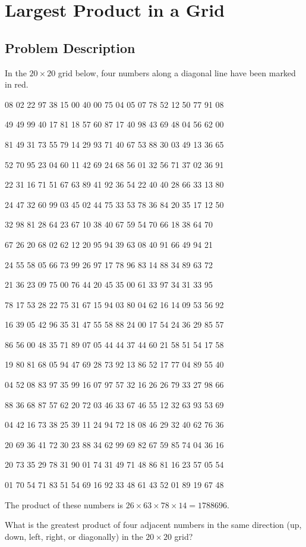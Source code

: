 \section{Largest Product in a Grid}
\subsection{Problem Description}
In the $20 \times 20$
 grid below, four numbers along a diagonal line have been marked in red.

 \begin{center}
08 02 22 97 38 15 00 40 00 75 04 05 07 78 52 12 50 77 91 08

49 49 99 40 17 81 18 57 60 87 17 40 98 43 69 48 04 56 62 00

81 49 31 73 55 79 14 29 93 71 40 67 53 88 30 03 49 13 36 65

52 70 95 23 04 60 11 42 69 24 68 56 01 32 56 71 37 02 36 91

22 31 16 71 51 67 63 89 41 92 36 54 22 40 40 28 66 33 13 80

24 47 32 60 99 03 45 02 44 75 33 53 78 36 84 20 35 17 12 50

32 98 81 28 64 23 67 10 {\color{red!80!black}{26}} 38 40 67 59 54 70 66 18 38 64 70

67 26 20 68 02 62 12 20 95 {\color{red!80!black}{63}} 94 39 63 08 40 91 66 49 94 21

24 55 58 05 66 73 99 26 97 17 {\color{red!80!black}{78}} 78 96 83 14 88 34 89 63 72

21 36 23 09 75 00 76 44 20 45 35 {\color{red!80!black}{14}} 00 61 33 97 34 31 33 95

78 17 53 28 22 75 31 67 15 94 03 80 04 62 16 14 09 53 56 92

16 39 05 42 96 35 31 47 55 58 88 24 00 17 54 24 36 29 85 57

86 56 00 48 35 71 89 07 05 44 44 37 44 60 21 58 51 54 17 58

19 80 81 68 05 94 47 69 28 73 92 13 86 52 17 77 04 89 55 40

04 52 08 83 97 35 99 16 07 97 57 32 16 26 26 79 33 27 98 66

88 36 68 87 57 62 20 72 03 46 33 67 46 55 12 32 63 93 53 69

04 42 16 73 38 25 39 11 24 94 72 18 08 46 29 32 40 62 76 36

20 69 36 41 72 30 23 88 34 62 99 69 82 67 59 85 74 04 36 16

20 73 35 29 78 31 90 01 74 31 49 71 48 86 81 16 23 57 05 54

01 70 54 71 83 51 54 69 16 92 33 48 61 43 52 01 89 19 67 48

\end{center}

The product of these numbers is $26 \times 63 \times 78 \times 14 = 1788696$.

What is the greatest product of four adjacent numbers in the same direction (up, down, left, right, or diagonally) in
the $20 \times 20$ grid?
